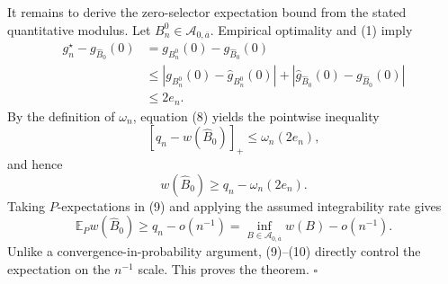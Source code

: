 It remains to derive the zero-selector expectation bound from the stated quantitative modulus.  Let \(B_n^0\in\mathcal A_{0,\overline a}\).  Empirical optimality and (1) imply
\[
\begin{aligned}
g_n^\star-g_{\widehat B_0}(0)
&=g_{B_n^0}(0)-g_{\widehat B_0}(0)\\
&\le
|g_{B_n^0}(0)-\widehat g_{B_n^0}(0)|
+|\widehat g_{\widehat B_0}(0)-g_{\widehat B_0}(0)|\\
&\le2e_n.
\end{aligned}
\tag{8}
\]
By the definition of \(\omega_n\), equation (8) yields the pointwise inequality
\[
[q_n-w(\widehat B_0)]_+\le\omega_n(2e_n),
\]
and hence
\[
w(\widehat B_0)\ge q_n-\omega_n(2e_n).
\tag{9}
\]
Taking \(P\)-expectations in (9) and applying the assumed integrability rate gives
\[
\mathbb E_Pw(\widehat B_0)
\ge q_n-o(n^{-1})
=\inf_{B\in\mathcal A_{0,\overline a}}w(B)-o(n^{-1}).
\tag{10}
\]
Unlike a convergence-in-probability argument, (9)--(10) directly control the expectation on the \(n^{-1}\) scale.  This proves the theorem. \(\square\)